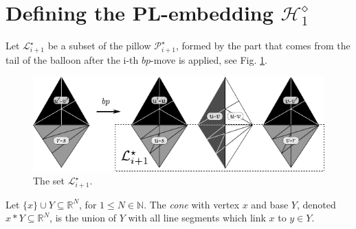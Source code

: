 

\section{Defining the PL-embedding $\mathcal{H}_{1}^\diamond$}\label{sec:rect}


Let $\mathcal{L}_{i+1}^\star$ be a subset of the pillow $\mathcal{P}_{i+1}^\star$, formed by the part
that comes from the tail of the balloon after the i-th $bp$-move is applied, see Fig. \ref{fig:U3}.

\begin{figure}[!htb]
\begin{center}
\includegraphics[width=13cm]{A.figs/U3.pdf}
\caption{The set $\mathcal{L}_{i+1}^\star$.} 
\label{fig:U3}
\end{center}
\end{figure}



Let $\{x\} \cup Y \subseteq \mathbb{R}^N$, for $1\le N \in \mathbb{N}$. 
The  {\em cone} \cite{rourke1982introduction} 
with vertex $x$ and base $Y$, denoted $x \ast Y \subseteq \mathbb{R}^N$,
is the union of $Y$ with all line 
segments which link $x$ to $y \in Y$.


